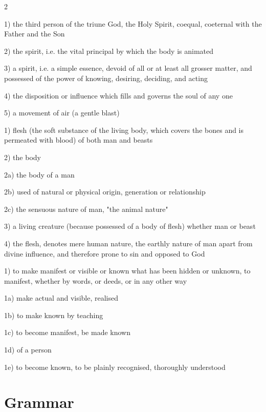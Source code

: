 \documentclass[letterpaper]{article}
\begin{document}
\begin{multicols}{2}
\begin{description}
1) the third person of the triune God, the Holy Spirit, coequal,
coeternal with the Father and the Son


2) the spirit, i.e. the vital principal by which the body is animated

3) a spirit, i.e. a simple essence, devoid of all or at least
all grosser matter, and possessed of the power of knowing,
desiring, deciding, and acting

4) the disposition or influence which fills and governs the soul
of any one

5) a movement of air (a gentle blast)



\item[4561: ]



1) flesh (the soft substance of the living body, which covers
the bones and is permeated with blood) of both man and beasts

2) the body

2a) the body of a man

2b) used of natural or physical origin, generation or
relationship

2c) the sensuous nature of man, "the animal nature"

3) a living creature (because possessed of a body of flesh)
whether man or beast

4) the flesh, denotes mere human nature, the earthly nature of man apart
from divine influence, and therefore prone to sin and opposed to God



\item[5319: ]



1) to make manifest or visible or known what has been hidden or unknown,
to manifest, whether by words, or deeds, or in any other way

1a) make actual and visible, realised

1b) to make known by teaching

1c) to become manifest, be made known

1d) of a person

1e) to become known, to be plainly recognised, thoroughly understood



\end{description}
\section*{Grammar}
\begin{description}


\end{description}
\end{multicols}
\end{document}

